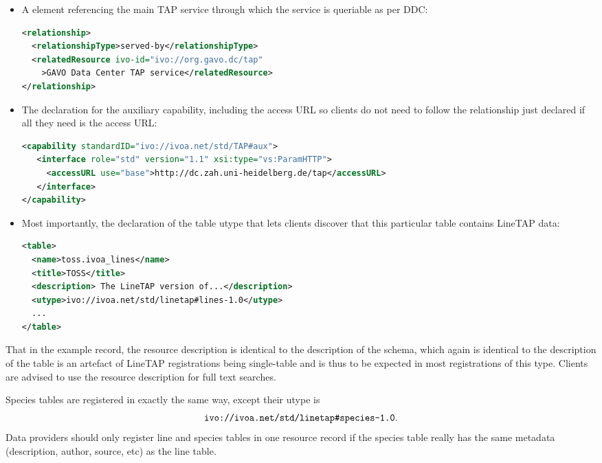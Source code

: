 \documentclass[11pt,a4paper]{ivoa}
\begin{document}
\begin{itemize}
\item A  element referencing the main TAP service
through which the service is queriable as per DDC:
\begin{lstlisting}[language=XML,basicstyle=\footnotesize]
<relationship>
  <relationshipType>served-by</relationshipType>
  <relatedResource ivo-id="ivo://org.gavo.dc/tap"
    >GAVO Data Center TAP service</relatedResource>
</relationship>
\end{lstlisting}

\item The declaration for the auxiliary capability, including the access
URL so clients do not need to follow the relationship just declared if
all they need is the access URL:
\begin{lstlisting}[language=XML,basicstyle=\footnotesize]
<capability standardID="ivo://ivoa.net/std/TAP#aux">
   <interface role="std" version="1.1" xsi:type="vs:ParamHTTP">
     <accessURL use="base">http://dc.zah.uni-heidelberg.de/tap</accessURL>
   </interface>
</capability>
\end{lstlisting}

\item Most importantly, the declaration of the table utype that lets
clients discover that this particular table contains LineTAP data:
\begin{lstlisting}[language=XML,basicstyle=\footnotesize]
<table>
  <name>toss.ivoa_lines</name>
  <title>TOSS</title>
  <description> The LineTAP version of...</description>
  <utype>ivo://ivoa.net/std/linetap#lines-1.0</utype>
  ...
</table>
\end{lstlisting}
\end{itemize}

That in the example record, the resource description is identical to the
description of the schema, which again is identical to the description
of the table is an artefact of LineTAP registrations being single-table
and is thus to be expected in most registrations of this type.  Clients
are advised to use the resource description for full text searches.

Species tables are registered in exactly the same way, except their
utype is
$$\hbox{\verb|ivo://ivoa.net/std/linetap#species-1.0|}.$$
Data providers should only register line and species tables in one
resource record if the species table really has the same metadata
(description, author, source, etc) as the line table.
\end{document}
